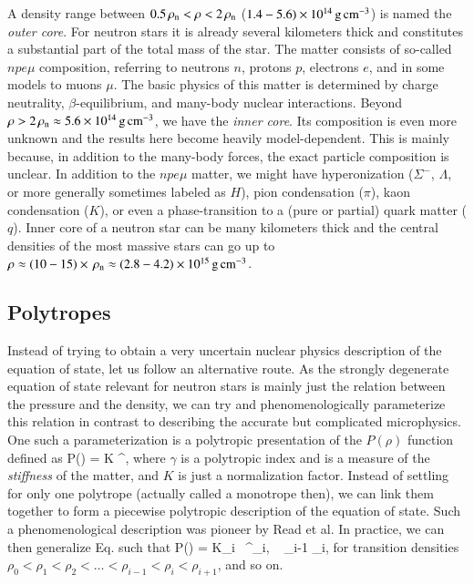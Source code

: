 A density range between $0.5 \, \rho_{\mathrm{n}}  < \rho < 2\, \rho_{\mathrm{n}} $ ($1.4 - 5.6) \times 10^{14}\, \mathrm{g}\,\mathrm{cm}^{-3}$) is named the \emph{outer core}.
For neutron stars it is already several kilometers thick and constitutes a substantial part of the total mass of the star.
The matter consists of so-called $npe\mu$ composition, referring to neutrons $n$, protons $p$, electrons $e$, and in some models to muons $\mu$.
The basic physics of this matter is determined by charge neutrality, $\beta$-equilibrium, and many-body nuclear interactions.
Beyond $\rho > 2 \, \rho_{\mathrm{n}}  \approx 5.6 \times 10^{14}\, \mathrm{g}\,\mathrm{cm}^{-3}$, we have the \emph{inner core}.
Its composition is even more unknown and the results here become heavily model-dependent.
This is mainly because, in addition to the many-body forces, the exact particle composition is unclear.
In addition to the $npe\mu$ matter, we might have hyperonization ($\Sigma^{-}$, $\Lambda$, or more generally sometimes labeled as $H$), pion condensation ($\pi$), kaon condensation ($K$), or even a phase-transition to a (pure or partial) quark matter ($q$).
Inner core of a neutron star can be many kilometers thick and the central densities of the most massive stars can go up to $\rho \approx (10-15) \times \, \rho_{\mathrm{n}}  \approx (2.8 - 4.2) \times 10^{15} \, \mathrm{g}\,\mathrm{cm}^{-3}$.


\subsection{Polytropes}

Instead of trying to obtain a very uncertain nuclear physics description of the equation of state, let us follow an alternative route.
As the strongly degenerate equation of state relevant for neutron stars is mainly just the relation between the pressure and the density, we can try and phenomenologically parameterize this relation in contrast to describing the accurate but complicated microphysics.
One such a parameterization is a polytropic presentation of the $P(\rho)$ function defined as
\be\label{eq:monotrope}
P(\rho) = K \rho^{\gamma},
\ee
where $\gamma$ is a polytropic index and is a measure of the \emph{stiffness} of the matter, and $K$ is just a normalization factor.
Instead of settling for only one polytrope (actually called a monotrope then), we can link them together to form a piecewise polytropic description of the equation of state.
Such a phenomenological description was pioneer by Read et al.\cite{Read09}
In practice, we can then generalize Eq. such that
\be
P(\rho) = K_i \, \rho^{\gamma_i}, \quad {}~ \rho_{i-1} \le \rho \le \rho_{i},
\ee
for transition densities $\rho_0 < \rho_1 < \rho_2  < \ldots < \rho_{i-1} < \rho_{i} < \rho_{i+1}$, and so on. 

